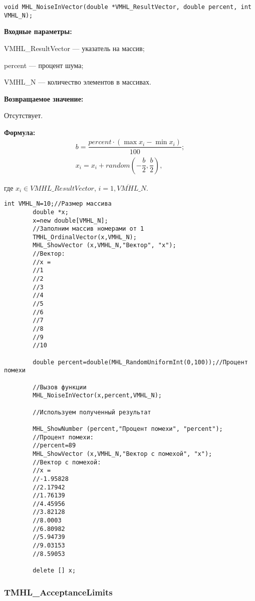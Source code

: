 \documentclass[a4paper,12pt]{article}
\begin{document}
\begin{lstlisting}[label=code_syntax_MHL_NoiseInVector,caption=Синтаксис]
void MHL_NoiseInVector(double *VMHL_ResultVector, double percent, int VMHL_N);
\end{lstlisting}

\textbf{Входные параметры:}  

 VMHL\_ResultVector --- указатель на массив;
 
 percent --- процент шума;
 
 VMHL\_N --- количество элементов в массивах.

\textbf{Возвращаемое значение:}

Отсутствует.

\textbf{Формула:}
\begin{eqnarray*}
b=\dfrac{percent\cdot\left( \max{x_i}-\min{x_i}\right)}{100};\\
x_i=x_i+random \left( -\dfrac{b}{2},\dfrac{b}{2}\right),
\end{eqnarray*}

где $x_i \in VMHL\_ResultVector$, $i=\overline{1,VMHL\_N}$.


\begin{lstlisting}[label=code_use_MHL_NoiseInVector,caption=Пример использования]
        int VMHL_N=10;//Размер массива
        double *x;
        x=new double[VMHL_N];
        //Заполним массив номерами от 1
        TMHL_OrdinalVector(x,VMHL_N);
        MHL_ShowVector (x,VMHL_N,"Вектор", "x");
        //Вектор:
        //x =
        //1
        //2
        //3
        //4
        //5
        //6
        //7
        //8
        //9
        //10

        double percent=double(MHL_RandomUniformInt(0,100));//Процент помехи

        //Вызов функции
        MHL_NoiseInVector(x,percent,VMHL_N);

        //Используем полученный результат

        MHL_ShowNumber (percent,"Процент помехи", "percent");
        //Процент помехи:
        //percent=89
        MHL_ShowVector (x,VMHL_N,"Вектор с помехой", "x");
        //Вектор с помехой:
        //x =
        //-1.95828
        //2.17942
        //1.76139
        //4.45956
        //3.82128
        //8.0003
        //6.80982
        //5.94739
        //9.03153
        //8.59053

        delete [] x;
\end{lstlisting}

\subsubsection{TMHL\_AcceptanceLimits}\label{TMHL_AcceptanceLimits}
\end{document}
